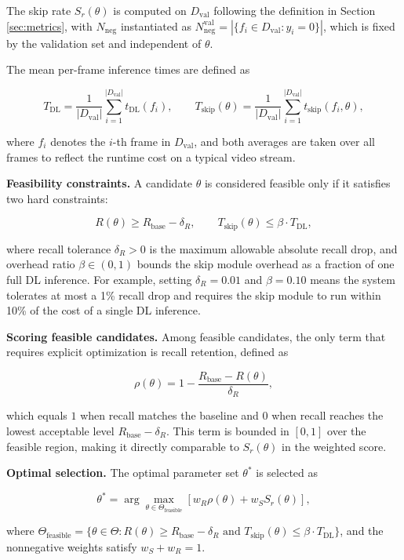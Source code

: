The skip rate $S_r(\theta)$ is computed on $D_{\text{val}}$ following the
definition in Section \ref{sec:metrics}, with $N_{\text{neg}}$ instantiated as
$N_{\text{neg}}^{\text{val}} = |\{f_i \in D_{\text{val}} : y_i = 0\}|$, which is
fixed by the validation set and independent of $\theta$.

The mean per-frame inference times are defined as

\[ T_{\text{DL}} = \frac{1}{|D_{\text{val}}|} \sum_{i=1}^{|D_{\text{val}}|}
t_{\text{DL}}(f_i), \qquad T_{\text{skip}}(\theta) = \frac{1}{|D_{\text{val}}|}
\sum_{i=1}^{|D_{\text{val}}|} t_{\text{skip}}(f_i, \theta), \]

where $f_i$ denotes the $i$-th frame in $D_{\text{val}}$, and both averages are
taken over all frames to reflect the runtime cost on a typical video stream.

\textbf{Feasibility constraints.} A candidate $\theta$ is considered feasible
only if it satisfies two hard constraints:

\[ R(\theta) \geq R_{\text{base}} - \delta_R, \qquad T_{\text{skip}}(\theta)
\leq \beta \cdot T_{\text{DL}}, \]

where recall tolerance $\delta_R > 0$ is the maximum allowable absolute recall
drop, and overhead ratio $\beta \in (0, 1)$ bounds the skip module overhead as a fraction of one full DL
inference. For example, setting $\delta_R = 0.01$ and $\beta = 0.10$ means the
system tolerates at most a 1\% recall drop and requires the skip module to run
within 10\% of the cost of a single DL inference.

\textbf{Scoring feasible candidates.} Among feasible candidates, the only
term that requires explicit optimization is recall retention, defined as

\[ \rho(\theta) = 1 - \frac{R_{\text{base}} - R(\theta)}{\delta_R}, \]

which equals $1$ when recall matches the baseline and $0$ when recall reaches
the lowest acceptable level $R_{\text{base}} - \delta_R$. This term is bounded
in $[0, 1]$ over the feasible region, making it directly comparable to
$S_r(\theta)$ in the weighted score.

\textbf{Optimal selection.} The optimal parameter set $\theta^*$ is selected as

\[ \theta^* = \arg\max_{\theta \in \Theta_{\text{feasible}}} \left[ w_R  \rho(\theta) + w_S S_r(\theta) \right], \]

where $\Theta_{\text{feasible}} = \{\theta \in \Theta : R(\theta) \geq
R_{\text{base}} - \delta_R \text{ and } T_{\text{skip}}(\theta) \leq \beta \cdot
T_{\text{DL}}\}$, and the nonnegative weights satisfy $w_S + w_R = 1$.


